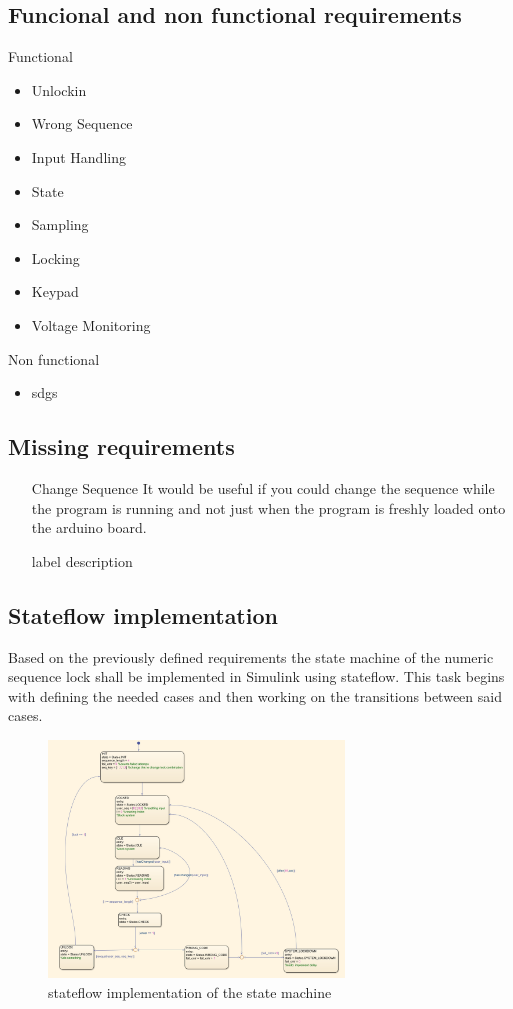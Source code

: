 	
	\subsection{Funcional and non functional requirements}
	Functional	
		\begin{itemize}
			\item Unlockin
			\item Wrong Sequence
			\item Input Handling
			\item State
			\item Sampling
			\item Locking
			\item Keypad
			\item Voltage Monitoring
		\end{itemize}
	Non functional
		\begin{itemize}
			\item sdgs
		\end{itemize}

	\subsection{Missing requirements}
	
		\begin{itemize}
			\item[Change Sequence] It would be useful if you could change the sequence while the program is running and not just when the program is freshly loaded onto the arduino board.
			\item[label] description
		\end{itemize}

\subsection{Stateflow implementation}
Based on the previously defined requirements the state machine of the numeric sequence lock shall be implemented in Simulink using stateflow. This task begins with defining the needed cases and then working on the transitions between said cases.
\begin{figure}[H]
		\centering
		\includegraphics[width=0.7\textwidth]{figures/stateflow.png}
		\caption{stateflow implementation of the state machine}
		\label{fig:scheme}
\end{figure}

